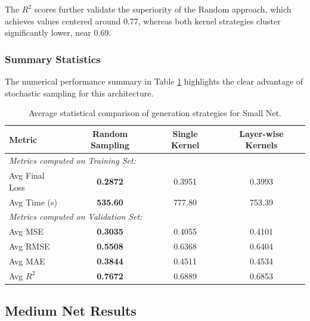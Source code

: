 The $R^2$ scores further validate the superiority of the Random approach, which achieves values centered around 0.77, whereas both kernel strategies cluster significantly lower, near 0.69.

\subsubsection{Summary Statistics}

The numerical performance summary in Table \ref{tab:small_net_comp_results_fixed} highlights the clear advantage of stochastic sampling for this architecture.

\begin{table}[h]
\centering
\scriptsize
\begin{tabular}{|l|c|c|c|}
\hline
\textbf{Metric} & \textbf{Random Sampling} & \textbf{Single Kernel} & \textbf{Layer-wise Kernels} \\ \hline
\multicolumn{4}{|l|}{\textit{Metrics computed on Training Set:}} \\ \hline
Avg Final Loss        & \textbf{0.2872}                       & 0.3951                 & 0.3993                      \\ \hline
Avg Time (s)          & \textbf{535.60}                       & 777.80                 & 753.39                      \\ \hline
\multicolumn{4}{|l|}{\textit{Metrics computed on Validation Set:}} \\ \hline
Avg MSE               & \textbf{0.3035}                       & 0.4055                 & 0.4101                      \\ \hline
Avg RMSE              & \textbf{0.5508}                       & 0.6368                 & 0.6404                      \\ \hline
Avg MAE               & \textbf{0.3844}                       & 0.4511                 & 0.4534                      \\ \hline
Avg $R^2$             & \textbf{0.7672}                       & 0.6889                 & 0.6853                      \\ \hline
\end{tabular}
\caption{Average statistical comparison of generation strategies for Small Net.}
\label{tab:small_net_comp_results_fixed}
\end{table}

\clearpage

\subsection{Medium Net Results}

